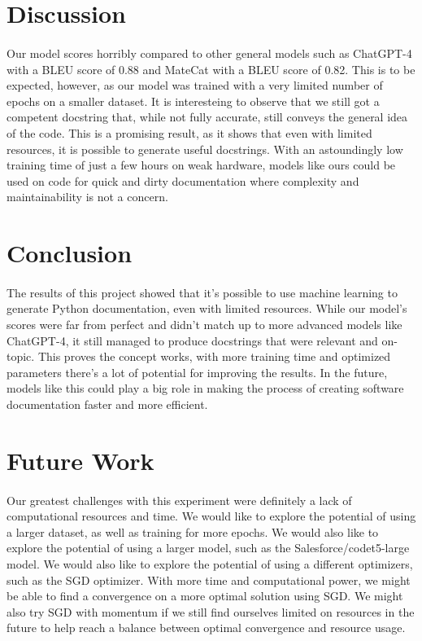 \documentclass[12pt]{article}
\begin{document}
	\section{Discussion}
	\paragraph{} Our model scores horribly compared to other general models such as ChatGPT-4 with a BLEU score of 0.88 and MateCat with a BLEU score of 0.82. \cite{ghassemiazghandi2024evaluation} This is to be expected, however, as our model was trained with a very limited number of epochs on a smaller dataset. It is interesteing to observe that we still got a competent docstring that, while not fully accurate, still conveys the general idea of the code. This is a promising result, as it shows that even with limited resources, it is possible to generate useful docstrings. With an astoundingly low training time of just a few hours on weak hardware, models like ours could be used on code for quick and dirty documentation where complexity and maintainability is not a concern.

	\section{Conclusion}
	\paragraph{} The results of this project showed that it's possible to use machine learning to generate Python documentation, even with limited resources. While our model's scores were far from perfect and didn’t match up to more advanced models like ChatGPT-4, it still managed to produce docstrings that were relevant and on-topic. This proves the concept works, with more training time and optimized parameters there's a lot of potential for improving the results. In the future, models like this could play a big role in making the process of creating software documentation faster and more efficient.

	\section{Future Work}
	\paragraph{} Our greatest challenges with this experiment were definitely a lack of computational resources and time. We would like to explore the potential of using a larger dataset, as well as training for more epochs. We would also like to explore the potential of using a larger model, such as the Salesforce/codet5-large model. We would also like to explore the potential of using a different optimizers, such as the SGD optimizer. With more time and computational power, we might be able to find a convergence on a more optimal solution using SGD. We might also try SGD with momentum if we still find ourselves limited on resources in the future to help reach a balance between optimal convergence and resource usage.
\end{document}

